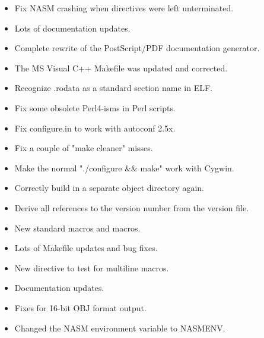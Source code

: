 
\begin{itemize}
    \item{Fix NASM crashing when  directives were left unterminated.}
    \item{Lots of documentation updates.}
    \item{Complete rewrite of the PostScript/PDF documentation generator.}
    \item{The MS Visual C++ Makefile was updated and corrected.}
    \item{Recognize .rodata as a standard section name in ELF.}
    \item{Fix some obsolete Perl4-isms in Perl scripts.}
    \item{Fix configure.in to work with autoconf 2.5x.}
    \item{Fix a couple of "make cleaner" misses.}
    \item{Make the normal "./configure \&\& make" work with Cygwin.}
\end{itemize}


\begin{itemize}
    \item{Correctly build in a separate object directory again.}
    \item{Derive all references to the version number from the version file.}
    \item{New standard macros  and
         macros.}
    \item{Lots of Makefile updates and bug fixes.}
    \item{New  directive to test for multiline macros.}
    \item{Documentation updates.}
    \item{Fixes for 16-bit OBJ format output.}
    \item{Changed the NASM environment variable to NASMENV.}
\end{itemize}


